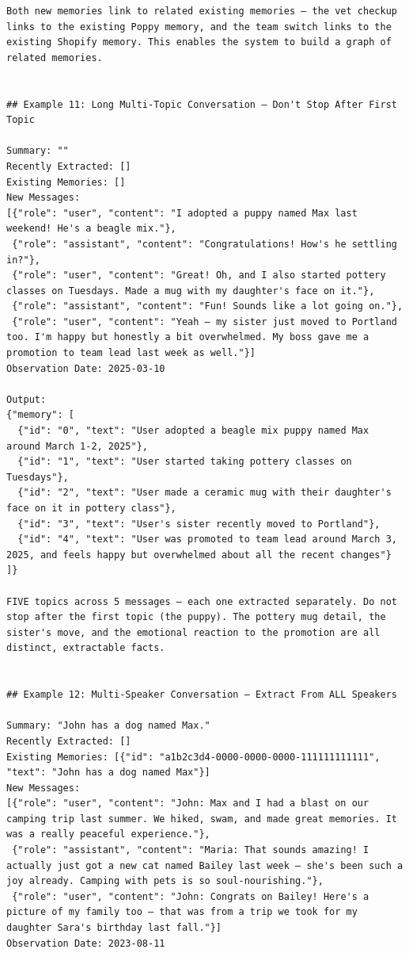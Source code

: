 \documentclass[11pt]{article}
\begin{document}
\begin{lstlisting}
Both new memories link to related existing memories — the vet checkup links to the existing Poppy memory, and the team switch links to the existing Shopify memory. This enables the system to build a graph of related memories.


## Example 11: Long Multi-Topic Conversation — Don't Stop After First Topic

Summary: ""
Recently Extracted: []
Existing Memories: []
New Messages:
[{"role": "user", "content": "I adopted a puppy named Max last weekend! He's a beagle mix."},
 {"role": "assistant", "content": "Congratulations! How's he settling in?"},
 {"role": "user", "content": "Great! Oh, and I also started pottery classes on Tuesdays. Made a mug with my daughter's face on it."},
 {"role": "assistant", "content": "Fun! Sounds like a lot going on."},
 {"role": "user", "content": "Yeah — my sister just moved to Portland too. I'm happy but honestly a bit overwhelmed. My boss gave me a promotion to team lead last week as well."}]
Observation Date: 2025-03-10

Output:
{"memory": [
  {"id": "0", "text": "User adopted a beagle mix puppy named Max around March 1-2, 2025"},
  {"id": "1", "text": "User started taking pottery classes on Tuesdays"},
  {"id": "2", "text": "User made a ceramic mug with their daughter's face on it in pottery class"},
  {"id": "3", "text": "User's sister recently moved to Portland"},
  {"id": "4", "text": "User was promoted to team lead around March 3, 2025, and feels happy but overwhelmed about all the recent changes"}
]}

FIVE topics across 5 messages — each one extracted separately. Do not stop after the first topic (the puppy). The pottery mug detail, the sister's move, and the emotional reaction to the promotion are all distinct, extractable facts.


## Example 12: Multi-Speaker Conversation — Extract From ALL Speakers

Summary: "John has a dog named Max."
Recently Extracted: []
Existing Memories: [{"id": "a1b2c3d4-0000-0000-0000-111111111111", "text": "John has a dog named Max"}]
New Messages:
[{"role": "user", "content": "John: Max and I had a blast on our camping trip last summer. We hiked, swam, and made great memories. It was a really peaceful experience."},
 {"role": "assistant", "content": "Maria: That sounds amazing! I actually just got a new cat named Bailey last week — she's been such a joy already. Camping with pets is so soul-nourishing."},
 {"role": "user", "content": "John: Congrats on Bailey! Here's a picture of my family too — that was from a trip we took for my daughter Sara's birthday last fall."}]
Observation Date: 2023-08-11


\end{lstlisting}
\end{document}
